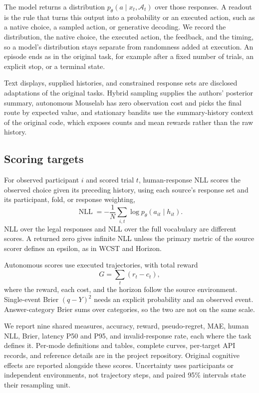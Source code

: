 \documentclass[11pt,a4paper]{article}
\begin{document}
The model returns a distribution $p_\theta(a\mid x_t,\mathcal A_t)$ over those responses. A readout is the rule that turns this output into a probability or an executed action, such as a native choice, a sampled action, or generative decoding. We record the distribution, the native choice, the executed action, the feedback, and the timing, so a model's distribution stays separate from randomness added at execution. An episode ends as in the original task, for example after a fixed number of trials, an explicit stop, or a terminal state.

Text displays, supplied histories, and constrained response sets are disclosed adaptations of the original tasks. Hybrid sampling supplies the authors' posterior summary, autonomous Mouselab has zero observation cost and picks the final route by expected value, and stationary bandits use the summary-history context of the original code, which exposes counts and mean rewards rather than the raw history.

\subsection{Scoring targets}
For observed participant $i$ and scored trial $t$, human-response NLL scores the observed choice given its preceding history, using each source's response set and its participant, fold, or response weighting,
\begin{equation}
 \operatorname{NLL}=-\frac{1}{N}\sum_{i,t}\log p_\theta(a_{it}\mid h_{it}).
 \label{eq:nll}
\end{equation}
NLL over the legal responses and NLL over the full vocabulary are different scores. A returned zero gives infinite NLL unless the primary metric of the source scorer defines an epsilon, as in WCST and Horizon.

Autonomous scores use executed trajectories, with total reward
\begin{equation}
 G=\sum_t(r_t-c_t),
 \label{eq:return}
\end{equation}
where the reward, each cost, and the horizon follow the source environment. Single-event Brier $(q-Y)^2$ needs an explicit probability and an observed event. Answer-category Brier sums over categories, so the two are not on the same scale.

We report nine shared measures, accuracy, reward, pseudo-regret, MAE, human NLL, Brier, latency P50 and P95, and invalid-response rate, each where the task defines it. Per-mode definitions and tables, complete curves, per-target API records, and reference details are in the project repository. Original cognitive effects are reported alongside these scores. Uncertainty uses participants or independent environments, not trajectory steps, and paired 95\% intervals state their resampling unit.
\end{document}
